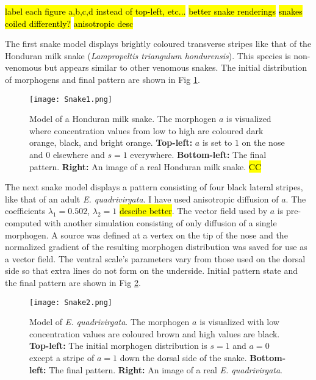 \hl{label each figure a,b,c,d instead of top-left, etc...}
\hl{better snake renderings}
\hl{snakes coiled differently?}
\hl{anisotropic desc}

The first snake model displays brightly coloured transverse stripes like that of the Honduran milk snake (\textit{Lampropeltis triangulum hondurensis}). This species is non-venomous but appears similar to other venomous snakes. The initial distribution of morphogens and final pattern are shown in Fig \ref{fig:Snake1}.

\begin{figure}[ht]
	\centering
	\texttt{[image: Snake1.png]}
	\caption{Model of a Honduran milk snake. The morphogen $a$ is visualized where concentration values from low to high are coloured dark orange, black, and bright orange. \textbf{Top-left:} $a$ is set to $1$ on the nose and $0$ elsewhere and $s=1$ everywhere. \textbf{Bottom-left:} The final pattern. \textbf{Right:} An image of a real Honduran milk snake. \hl{CC}}
	\label{fig:Snake1}
\end{figure}

The next snake model displays a pattern consisting of four black lateral stripes, like that of an adult \textit{E. quadrivirgata}. I have used anisotropic diffusion of $a$. The coefficients $\lambda_{1}=0.502$, $\lambda_{2}=1$ \hl{descibe better}. The vector field used by $a$ is pre-computed with another simulation consisting of only diffusion of a single morphogen. A source was defined at a vertex on the tip of the nose and the normalized gradient of the resulting morphogen distribution was saved for use as a vector field. The ventral scale's parameters vary from those used on the dorsal side so that extra lines do not form on the underside. Initial pattern state and the final pattern are shown in Fig \ref{fig:Snake2}.

\begin{figure}[ht]
	\centering
	\texttt{[image: Snake2.png]}
	\caption{Model of \textit{E. quadrivirgata}. The morphogen $a$ is visualized with low concentration values are coloured brown and high values are black. \textbf{Top-left:} The initial morphogen distribution is $s=1$ and $a=0$ except a stripe of $a=1$ down the dorsal side of the snake. \textbf{Bottom-left:} The final pattern. \textbf{Right:} An image of a real \textit{E. quadrivirgata}.}
	\label{fig:Snake2}
\end{figure}

